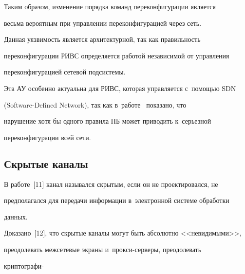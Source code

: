   Таким образом, изменение порядка команд переконфигурации является 


весьма вероятным при управлении переконфигурацией через сеть. 


  


  Данная уязвимость является архитектурной, так как правильность 


переконфигурации РИВС определяется работой независимой от управления 


переконфигурацией сетевой подсистемы. 


  


  Эта АУ особенно актуальна для РИВС, которая управляется с~помощью SDN 


(Software-Defined Network), так как в~работе~\cite{10-g2} показано, что 


нарушение хотя бы одного правила ПБ может приводить к~серьезной 


переконфигурации всей сети.





\vspace*{-4pt}


  


\subsection{Скрытые каналы }





  В работе~[11] канал назывался скрытым, если он не проектировался, не 


предполагался для передачи информации в~электронной системе обработки 


данных. 


  


  Доказано~[12], что скрытые каналы могут быть абсолютно <<невидимыми>>, 


преодолевать межсетевые экраны и~прок\-си-сер\-ве\-ры, преодолевать 


криптографи-\linebreak\vspace*{-12pt}





\pagebreak





